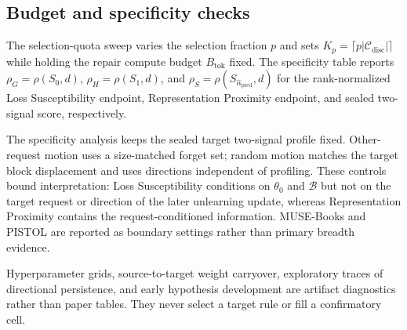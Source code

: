 \subsection{Budget and specificity checks}
\label{app:specificity}

The selection-quota sweep varies the selection fraction $p$ and sets
$K_p=\lceil p|\mathcal C_{\mathrm{disc}}|\rceil$ while holding the repair compute
budget $B_{\mathrm{tok}}$ fixed. The specificity table reports
$\rho_G=\rho(S_0,d)$, $\rho_H=\rho(S_1,d)$, and
$\rho_S=\rho(S_{\widehat\alpha_{\mathrm{pred}}},d)$ for the rank-normalized
Loss Susceptibility endpoint, Representation Proximity endpoint,
and sealed two-signal score, respectively.

The specificity analysis keeps the sealed target two-signal profile fixed.
Other-request motion uses a size-matched forget set; random motion matches the target block
displacement and uses directions independent of profiling. These controls
bound interpretation: Loss Susceptibility conditions on
$\theta_0$ and $\mathcal B$ but not on the target request or direction of the
later unlearning update, whereas Representation Proximity contains the
request-conditioned information.
MUSE-Books and PISTOL are reported as boundary settings rather than primary
breadth evidence.

Hyperparameter grids, source-to-target weight carryover, exploratory traces of
directional persistence, and early hypothesis development are artifact
diagnostics rather than paper tables. They never select a target rule or fill
a confirmatory cell.



\FloatBarrier
